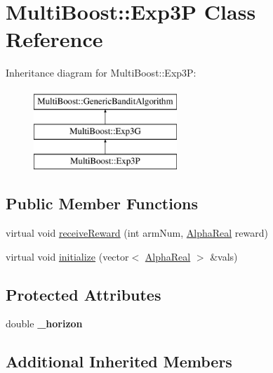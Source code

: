 \hypertarget{classMultiBoost_1_1Exp3P}{\section{Multi\-Boost\-:\-:Exp3\-P Class Reference}
\label{classMultiBoost_1_1Exp3P}
}
Inheritance diagram for Multi\-Boost\-:\-:Exp3\-P\-:\begin{figure}[H]
\begin{center}
\leavevmode
\includegraphics[height=3.000000cm]{classMultiBoost_1_1Exp3P}
\end{center}
\end{figure}
\subsection*{Public Member Functions}
\begin{DoxyCompactItemize}
\item 
virtual void \hyperlink{classMultiBoost_1_1Exp3P_a01489e450c6de42354a6ea726599ffff}{receive\-Reward} (int arm\-Num, \hyperlink{Defaults_8h_a80184c4fd10ab70a1a17c5f97dcd1563}{Alpha\-Real} reward)
\item 
virtual void \hyperlink{classMultiBoost_1_1Exp3P_a108129f4aa9eaf9d6ceab4c87ae76c22}{initialize} (vector$<$ \hyperlink{Defaults_8h_a80184c4fd10ab70a1a17c5f97dcd1563}{Alpha\-Real} $>$ \&vals)
\end{DoxyCompactItemize}
\subsection*{Protected Attributes}
\begin{DoxyCompactItemize}
\item 
\hypertarget{classMultiBoost_1_1Exp3P_ad66c466b559922f5b3cd25974627aea3}{double {\bfseries \-\_\-horizon}}\label{classMultiBoost_1_1Exp3P_ad66c466b559922f5b3cd25974627aea3}

\end{DoxyCompactItemize}
\subsection*{Additional Inherited Members}


